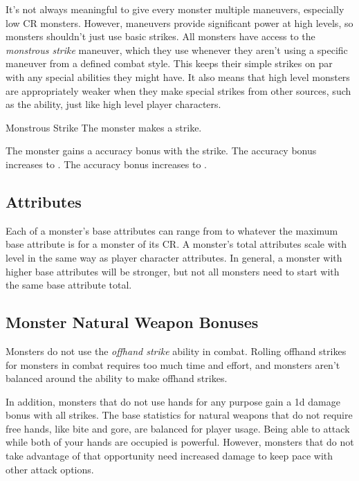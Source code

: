             It's not always meaningful to give every monster multiple maneuvers, especially low CR monsters.
            However, maneuvers provide significant power at high levels, so monsters shouldn't just use basic strikes.
            All monsters have access to the \textit{monstrous strike} maneuver, which they use whenever they aren't using a specific maneuver from a defined combat style.
            This keeps their simple strikes on par with any special abilities they might have.
            It also means that high level monsters are appropriately weaker when they make special strikes from other sources, such as the  ability, just like high level player characters.
            \begin{freeability}{Monstrous Strike}
                The monster makes a strike.

                \rankline
                 The monster gains a  accuracy bonus with the strike.
                 The accuracy bonus increases to .
                 The accuracy bonus increases to .
            \end{freeability}

    \subsection{Attributes}
        Each of a monster's base attributes can range from  to whatever the maximum base attribute is for a monster of its CR.
        A monster's total attributes scale with level in the same way as player character attributes.
        In general, a monster with higher base attributes will be stronger, but not all monsters need to start with the same base attribute total.

    \subsection{Monster Natural Weapon Bonuses}\label{Monster Natural Weapon Bonuses}
        Monsters do not use the \textit{offhand strike} ability in combat.
        Rolling offhand strikes for monsters in combat requires too much time and effort, and monsters aren't balanced around the ability to make offhand strikes.

        In addition, monsters that do not use hands for any purpose gain a \plus1d damage bonus with all strikes.
        The base statistics for natural weapons that do not require free hands, like bite and gore, are balanced for player usage.
        Being able to attack while both of your hands are occupied is powerful.
        However, monsters that do not take advantage of that opportunity need increased damage to keep pace with other attack options.

